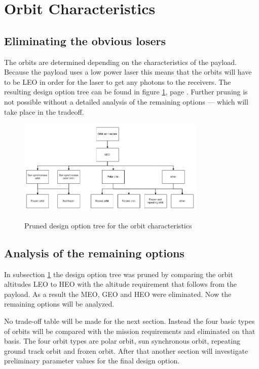\documentclass{article}
\begin{document}
\section{Orbit Characteristics}
\label{pruneOrbit}

\subsection{Eliminating the obvious losers}
The orbits are determined depending on the characteristics of the payload. Because the payload uses a low power laser this means that the orbits will have to be \ac{LEO} in order for the laser to get any photons to the receivers. The resulting design option tree can be found in figure \ref{fig:pruneOrbit}, page \pageref{fig:pruneOrbit}. Further pruning is not possible without a detailed analysis of the remaining options --- which will take place in the tradeoff.

\begin{figure}
\centering
\includegraphics[width=0.8\textwidth, angle=0]{chapters/img/PrunedOrbit.jpg}
\label{fig:pruneOrbit}
\caption{Pruned design option tree for the orbit characteristics}
\end{figure}

\subsection{Analysis of the remaining options}
\label{OrbAnal}

In subsection \ref{pruneOrbit} the design option tree was pruned by comparing the orbit altitudes \ac{LEO} to \ac{HEO} with the altitude requirement that follows from the payload. As a result the \acs{MEO}, \acs{GEO} and \acs{HEO} were eliminated. Now the remaining options will be analyzed.

No trade-off table will be made for the next section. Instead the four basic types of orbits will be compared with the mission requirements and eliminated on that basis. The four orbit types are polar orbit, sun synchronous orbit, repeating ground track orbit and frozen orbit. After that another section will investigate preliminary parameter values for the final design option.
\end{document}
